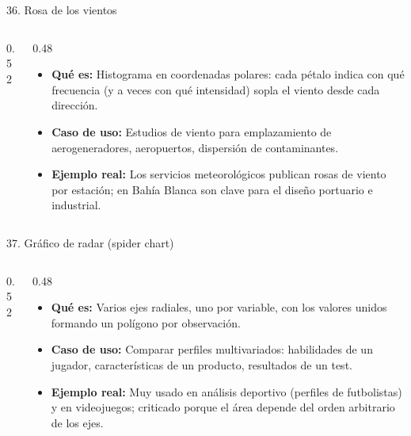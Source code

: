 \documentclass[aspectratio=169,9pt]{beamer}
\newcommand{\ficha}[3]{%
\begin{itemize}
\item \textbf{Qué es:} #1
\item \textbf{Caso de uso:} #2
\item \textbf{Ejemplo real:} #3
\end{itemize}}
\begin{document}
\begin{frame}{36. Rosa de los vientos}
\begin{columns}[T]
\begin{column}{0.52\textwidth}
\centering
{}
\end{column}
\begin{column}{0.48\textwidth}
\ficha{Histograma en coordenadas polares: cada pétalo indica con qué frecuencia (y a veces con qué intensidad) sopla el viento desde cada dirección.}
{Estudios de viento para emplazamiento de aerogeneradores, aeropuertos, dispersión de contaminantes.}
{Los servicios meteorológicos publican rosas de viento por estación; en Bahía Blanca son clave para el diseño portuario e industrial.}
\end{column}
\end{columns}
\end{frame}

\begin{frame}{37. Gráfico de radar (spider chart)}
\begin{columns}[T]
\begin{column}{0.52\textwidth}
\centering
{}
\end{column}
\begin{column}{0.48\textwidth}
\ficha{Varios ejes radiales, uno por variable, con los valores unidos formando un polígono por observación.}
{Comparar perfiles multivariados: habilidades de un jugador, características de un producto, resultados de un test.}
{Muy usado en análisis deportivo (perfiles de futbolistas) y en videojuegos; criticado porque el área depende del orden arbitrario de los ejes.}
\end{column}
\end{columns}
\end{frame}
\end{document}
